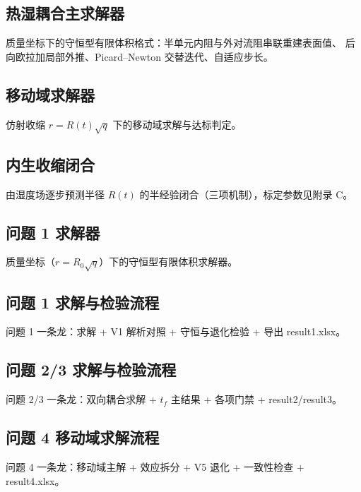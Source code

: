 \documentclass[12pt,a4paper]{ctexart}
\numberwithin{equation}{section}
\begin{document}
\subsection{热湿耦合主求解器}
质量坐标下的守恒型有限体积格式：半单元内阻与外对流阻串联重建表面值、
后向欧拉加局部外推、Picard--Newton 交替迭代、自适应步长。


\subsection{移动域求解器}
仿射收缩 $r=R(t)\sqrt q$ 下的移动域求解与达标判定。


\subsection{内生收缩闭合}
由湿度场逐步预测半径 $R(t)$ 的半经验闭合（三项机制），标定参数见附录 C。


\subsection{问题 1 求解器}
质量坐标（$r=R_0\sqrt q$）下的守恒型有限体积求解器。


\subsection{问题 1 求解与检验流程}
问题 1 一条龙：求解 + V1 解析对照 + 守恒与退化检验 + 导出 result1.xlsx。


\subsection{问题 2/3 求解与检验流程}
问题 2/3 一条龙：双向耦合求解 + $t_f$ 主结果 + 各项门禁 + result2/result3。


\subsection{问题 4 移动域求解流程}
问题 4 一条龙：移动域主解 + 效应拆分 + V5 退化 + 一致性检查 + result4.xlsx。

\end{document}
